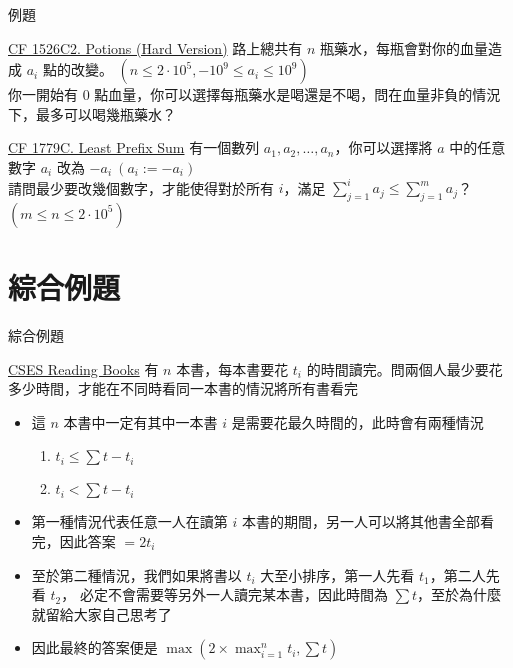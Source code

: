 \documentclass[aspectratio=169]{beamer}
\begin{document}
    \begin{frame}{例題}
        \begin{block}{\href{https://codeforces.com/problemset/problem/1526/C2}{CF 1526C2. Potions (Hard Version)}}
            路上總共有 $n$ 瓶藥水，每瓶會對你的血量造成 $a_i$ 點的改變。 $(n \le 2 \cdot 10^5, -10^9 \le a_i \le 10^9)$\\
            你一開始有 $0$ 點血量，你可以選擇每瓶藥水是喝還是不喝，問在血量非負的情況下，最多可以喝幾瓶藥水？
        \end{block}

        \begin{block}{\href{https://codeforces.com/problemset/problem/1779/C}{CF 1779C. Least Prefix Sum}}
            有一個數列 $a_1, a_2, \dots, a_n$，你可以選擇將 $a$ 中的任意數字 $a_i$ 改為 $-a_i\ (a_i := -a_i)$\\
            請問最少要改幾個數字，才能使得對於所有 $i$，滿足 $\sum_{j = 1}^{i}{a_j} \le \sum_{j = 1}^{m}{a_j}$？$(m \le n \le 2 \cdot 10^5)$
        \end{block}
    \end{frame}

    \section{綜合例題}

    \begin{frame}{綜合例題}
        \begin{block}{\href{https://cses.fi/problemset/task/1631/}{CSES Reading Books}}
            有 $n$ 本書，每本書要花 $t_i$ 的時間讀完。問兩個人最少要花多少時間，才能在不同時看同一本書的情況將所有書看完
        \end{block}

        \begin{itemize}
            \item<1-> 這 $n$ 本書中一定有其中一本書 $i$ 是需要花最久時間的，此時會有兩種情況
            \begin{enumerate}
                \item<2-> $t_i \le \sum{t} - t_i$ 
                \item<2-> $t_i < \sum{t} - t_i$
            \end{enumerate}
            \item<3-> 第一種情況代表任意一人在讀第 $i$ 本書的期間，另一人可以將其他書全部看完，因此答案 $= 2t_i$
            \item<4-> 至於第二種情況，我們如果將書以 $t_i$ 大至小排序，第一人先看 $t_1$，第二人先看 $t_2$，
            必定不會需要等另外一人讀完某本書，因此時間為 $\sum{t}$，至於為什麼就留給大家自己思考了
            \item<5-> 因此最終的答案便是 $\max(2 \times \displaystyle\max_{i = 1}^{n}t_i, \sum{t})$
        \end{itemize}
    \end{frame}
\end{document}

